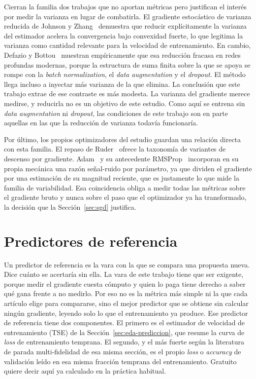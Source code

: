 Cierran la familia dos trabajos que no aportan métricas pero justifican el interés por medir la varianza en lugar de combatirla. El gradiente estocástico de varianza reducida de Johnson y Zhang~\cite{johnson2013accelerating} demuestra que reducir explícitamente la varianza del estimador acelera la convergencia bajo convexidad fuerte, lo que legitima la varianza como cantidad relevante para la velocidad de entrenamiento. En cambio, Defazio y Bottou~\cite{defazio2019ineffectiveness} muestran empíricamente que esa reducción fracasa en redes profundas modernas, porque la estructura de suma finita sobre la que se apoya se rompe con la \emph{batch normalization}, el \emph{data augmentation} y el \emph{dropout}. El método llega incluso a inyectar más varianza de la que elimina. La conclusión que este trabajo extrae de ese contraste es más modesta. La varianza del gradiente merece medirse, y reducirla no es un objetivo de este estudio. Como aquí se entrena sin \emph{data augmentation} ni \emph{dropout}, las condiciones de este trabajo son en parte aquellas en las que la reducción de varianza todavía funcionaría.

Por último, los propios optimizadores del estudio guardan una relación directa con esta familia. El repaso de Ruder~\cite{ruder2016overview} ofrece la taxonomía de variantes de descenso por gradiente. Adam~\cite{kingma2015adam} y su antecedente RMSProp~\cite{tieleman2012rmsprop} incorporan en su propia mecánica una razón señal-ruido por parámetro, ya que dividen el gradiente por una estimación de su magnitud reciente, que es justamente lo que mide la familia de variabilidad. Esa coincidencia obliga a medir todas las métricas sobre el gradiente bruto y nunca sobre el paso que el optimizador ya ha transformado, la decisión que la Sección~\ref{sec:sgd} justifica.

\section{Predictores de referencia}
\label{sec:sota-baselines}

Un predictor de referencia es la vara con la que se compara una propuesta nueva. Dice cuánto se acertaría sin ella. La vara de este trabajo tiene que ser exigente, porque medir el gradiente cuesta cómputo y quien lo paga tiene derecho a saber qué gana frente a no medirlo. Por eso no es la métrica más simple ni la que cada artículo elige para compararse, sino el mejor predictor que se obtiene sin calcular ningún gradiente, leyendo solo lo que el entrenamiento ya produce. Ese predictor de referencia tiene dos componentes. El primero es el estimador de velocidad de entrenamiento (TSE) de la Sección~\ref{sec:eda-prediccion}, que resume la curva de \emph{loss} de entrenamiento temprana. El segundo, y el más fuerte según la literatura de parada multi-fidelidad de esa misma sección, es el propio \emph{loss} o \emph{accuracy} de validación leído en esa misma fracción temprana del entrenamiento. Gratuito quiere decir aquí ya calculado en la práctica habitual.

